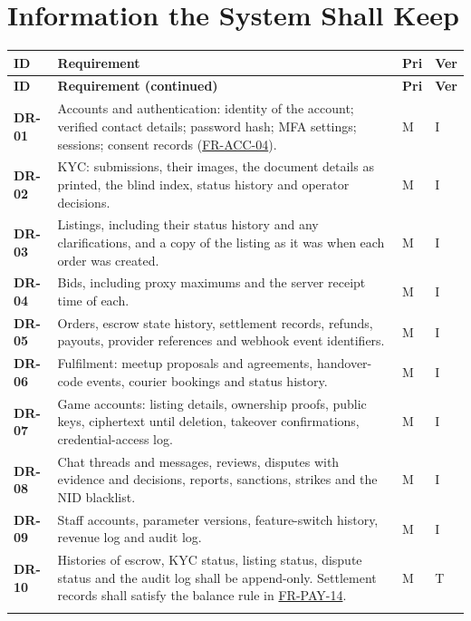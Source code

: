 \documentclass[11pt,a4paper]{report}
\makeatletter
\newenvironment{reqs}{%
  \small
  \begin{longtable}{@{}>{\raggedright\arraybackslash}p{2.35cm}
                       >{\raggedright\arraybackslash}p{10.3cm}
                       >{\centering\arraybackslash}p{0.7cm}
                       >{\centering\arraybackslash}p{0.7cm}@{}}
  \toprule
  \textbf{ID} & \textbf{Requirement} & \textbf{Pri} & \textbf{Ver} \\
  \midrule
  \endfirsthead
  \toprule
  \textbf{ID} & \textbf{Requirement (continued)} & \textbf{Pri} & \textbf{Ver} \\
  \midrule
  \endhead
  \bottomrule
  \endfoot
}{\end{longtable}}
\newcommand{\req}[5]{\leavevmode\textbf{#1}\hypertarget{#1}{} & #5 & #2 & #3 \\ \addlinespace[2pt]}
\newcommand{\rr}[1]{\hyperlink{#1}{#1}}
\makeatother
\begin{document}
\section{Information the System Shall Keep}
\begin{reqs}
\req{DR-01}{M}{I}{new}{Accounts and authentication: identity of the account; verified contact details; password hash; MFA settings; sessions; consent records (\rr{FR-ACC-04}).}
\req{DR-02}{M}{I}{new}{KYC: submissions, their images, the document details as printed, the blind index, status history and operator decisions.}
\req{DR-03}{M}{I}{new}{Listings, including their status history and any clarifications, and a copy of the listing as it was when each order was created.}
\req{DR-04}{M}{I}{new}{Bids, including proxy maximums and the server receipt time of each.}
\req{DR-05}{M}{I}{new}{Orders, escrow state history, settlement records, refunds, payouts, provider references and webhook event identifiers.}
\req{DR-06}{M}{I}{new}{Fulfilment: meetup proposals and agreements, handover-code events, courier bookings and status history.}
\req{DR-07}{M}{I}{new}{Game accounts: listing details, ownership proofs, public keys, ciphertext until deletion, takeover confirmations, credential-access log.}
\req{DR-08}{M}{I}{new}{Chat threads and messages, reviews, disputes with evidence and decisions, reports, sanctions, strikes and the NID blacklist.}
\req{DR-09}{M}{I}{new}{Staff accounts, parameter versions, feature-switch history, revenue log and audit log.}
\req{DR-10}{M}{T}{new}{Histories of escrow, KYC status, listing status, dispute status and the audit log shall be append-only. Settlement records shall satisfy the balance rule in \rr{FR-PAY-14}.}
\end{reqs}
\end{document}
